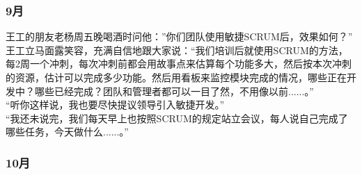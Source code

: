 \hypertarget{ux6708-2}{%
\subsubsection{9月}\label{ux6708-2}}

王工的朋友老杨周五晚喝酒时问他：''你们团队使用敏捷SCRUM后，效果如何？''\\
王工立马面露笑容，充满自信地跟大家说：``我们培训后就使用SCRUM的方法，每2周一个冲刺，每次冲刺前都会用故事点来估算每个功能多大，然后按本次冲刺的资源，估计可以完成多少功能。然后用看板来监控模块完成的情况，哪些正在开发中？哪些已经完成？团队和管理者都可以一目了然，不用像以前......。''\\
``听你这样说，我也要尽快提议领导引入敏捷开发。''\\
``我还未说完，我们每天早上也按照SCRUM的规定站立会议，每人说自己完成了哪些任务，今天做什么......。''

\hypertarget{ux6708-3}{%
\subsubsection{10月}\label{ux6708-3}}

